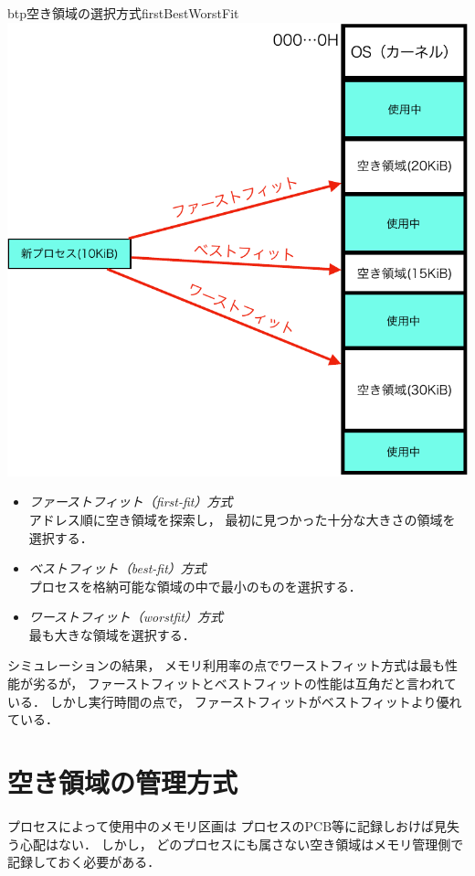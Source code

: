 \begin{myfig}{btp}{空き領域の選択方式}{firstBestWorstFit}
  \includegraphics[scale=0.66]{Fig/firstBestWorstFit-crop.pdf}
\end{myfig}

\begin{itemize}
\item \emph{ファーストフィット（first-fit）方式}\\
  アドレス順に空き領域を探索し，
  最初に見つかった十分な大きさの領域を選択する．
\item \emph{ベストフィット（best-fit）方式}\\
  プロセスを格納可能な領域の中で最小のものを選択する．
\item \emph{ワーストフィット（worstfit）方式}\\
  最も大きな領域を選択する．
\end{itemize}

シミュレーションの結果，
メモリ利用率の点でワーストフィット方式は最も性能が劣るが，
ファーストフィットとベストフィットの性能は互角だと言われている．
しかし実行時間の点で，
ファーストフィットがベストフィットより優れている\cite{MemoryAllocation}．

\section{空き領域の管理方式}
プロセスによって使用中のメモリ区画は
プロセスのPCB等に記録しおけば見失う心配はない．
しかし，
どのプロセスにも属さない空き領域はメモリ管理側で記録しておく必要がある．

